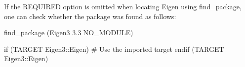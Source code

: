If the {\ttfamily R\+E\+Q\+U\+I\+R\+ED} option is omitted when locating Eigen using {\ttfamily find\+\_\+package}, one can check whether the package was found as follows\+: 
\begin{DoxyCode}
find\_package (Eigen3 3.3 NO\_MODULE)

if (TARGET Eigen3::Eigen)
  # Use the imported target
endif (TARGET Eigen3::Eigen)
\end{DoxyCode}
 